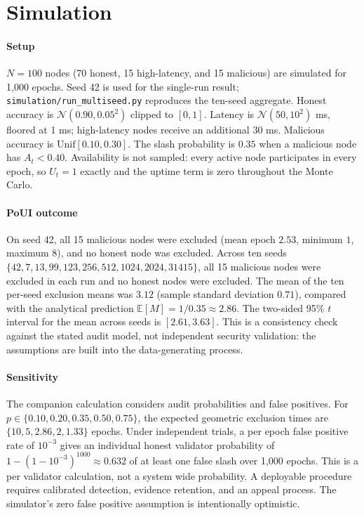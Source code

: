 \documentclass[conference]{IEEEtran}
\begin{document}
\section{Simulation}
\label{sec:sim}

\paragraph{Setup}
$N=100$ nodes (70 honest, 15 high-latency, and 15 malicious) are simulated for 1{,}000 epochs. Seed 42 is used for the single-run result; \texttt{simulation/run\_multiseed.py} reproduces the ten-seed aggregate. Honest accuracy is $\mathcal{N}(0.90,0.05^2)$ clipped to $[0,1]$. Latency is $\mathcal{N}(50,10^2)$ ms, floored at 1 ms; high-latency nodes receive an additional 30 ms. Malicious accuracy is $\mathrm{Unif}[0.10,0.30]$. The slash probability is $0.35$ when a malicious node has $A_t<0.40$. Availability is not sampled: every active node participates in every epoch, so $U_t=1$ exactly and the uptime term is zero throughout the Monte Carlo.

\paragraph{PoUI outcome}
On seed 42, all 15 malicious nodes were excluded (mean epoch $2.53$, minimum $1$, maximum $8$), and no honest node was excluded. Across ten seeds $\{42,7,13,99,123,256,512,1024,2024,31415\}$, all 15 malicious nodes were excluded in each run and no honest nodes were excluded. The mean of the ten per-seed exclusion means was $3.12$ (sample standard deviation $0.71$), compared with the analytical prediction $\mathbb{E}[M]=1/0.35\approx2.86$. The two-sided 95\% $t$ interval for the mean across seeds is $[2.61,3.63]$. This is a consistency check against the stated audit model, not independent security validation: the assumptions are built into the data-generating process.

\paragraph{Sensitivity} The companion calculation considers audit probabilities and false positives. For $p\in\{0.10,0.20,0.35,0.50,0.75\}$, the expected geometric exclusion times are $\{10,5,2.86,2,1.33\}$ epochs. Under independent trials, a per epoch false positive rate of $10^{-3}$ gives an individual honest validator probability of $1-(1-10^{-3})^{1000}\approx0.632$ of at least one false slash over 1{,}000 epochs. This is a per validator calculation, not a system wide probability. A deployable procedure requires calibrated detection, evidence retention, and an appeal process. The simulator's zero false positive assumption is intentionally optimistic.
\end{document}

